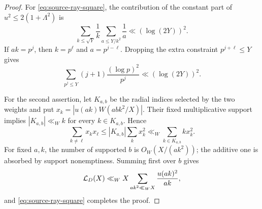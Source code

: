 \begin{proof}
For \eqref{eq:source-ray-square}, the contribution of the constant part
of $u^2\leq2(1+\Lambda^2)$ is
\[
 \sum_{k\leq\sqrt Y}\frac1k
 \sum_{a\leq Y/k^2}\frac1a
 \ll(\log(2Y))^2.
\]
If $ak=p^j$, then $k=p^\ell$ and $a=p^{j-\ell}$.  Dropping the extra
constraint $p^{j+\ell}\leq Y$ gives
\[
 \sum_{p^j\leq Y}(j+1)\frac{(\log p)^2}{p^j}
 \ll(\log(2Y))^2.
\]

For the second assertion, let $K_{a,b}$ be the radial indices selected by
the two weights and put $x_k=|u(ak)W(abk^2/X)|$.  Their fixed
multiplicative support implies $|K_{a,b}|\ll_Wk$ for every
$k\in K_{a,b}$.  Hence
\[
 \sum_{k\ne\ell}x_kx_\ell
 \leq |K_{a,b}|\sum_kx_k^2
 \ll_W\sum_{k\in K_{a,b}}k x_k^2.
\]
For fixed $a,k$, the number of supported $b$ is
$O_W(X/(ak^2))$; the additive one is absorbed by support nonemptiness.
Summing first over $b$ gives
\[
 \mathcal L_D(X)
 \ll_WX\sum_{ak^2\ll_WX}\frac{u(ak)^2}{ak},
\]
and \eqref{eq:source-ray-square} completes the proof.
\end{proof}
